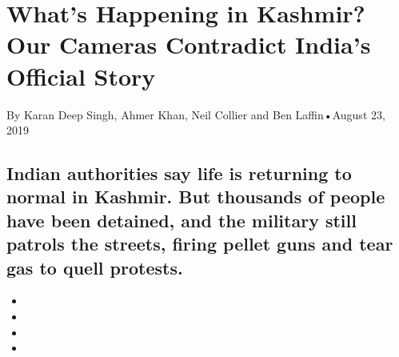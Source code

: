 \hypertarget{whats-happening-in-kashmir-our-cameras-contradict-indias-official-story-1}{%
\section{What's Happening in Kashmir? Our Cameras Contradict India's
Official
Story}\label{whats-happening-in-kashmir-our-cameras-contradict-indias-official-story-1}}

By Karan Deep Singh, Ahmer Khan, Neil Collier and Ben Laffin•August 23,
2019

\hypertarget{indian-authorities-say-life-is-returning-to-normal-in-kashmir-but-thousands-of-people-have-been-detained-and-the-military-still-patrols-the-streets-firing-pellet-guns-and-tear-gas-to-quell-protests-1}{%
\subsection{Indian authorities say life is returning to normal in
Kashmir. But thousands of people have been detained, and the military
still patrols the streets, firing pellet guns and tear gas to quell
protests.}\label{indian-authorities-say-life-is-returning-to-normal-in-kashmir-but-thousands-of-people-have-been-detained-and-the-military-still-patrols-the-streets-firing-pellet-guns-and-tear-gas-to-quell-protests-1}}

\begin{itemize}
\item
\item
\item
\item
\end{itemize}

